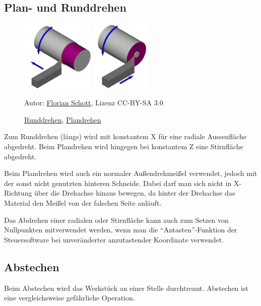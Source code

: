\documentclass{\basedir/fablab-document}
\begin{document}
\subsection{Plan- und Runddrehen}
\label{handdrehen:Plandrehen}
\begin{figure}
\centering
\includegraphics[height=3.4cm]{./img/laengs-rund-drehen.jpg}
\includegraphics[height=3.4cm]{./img/quer-plan-drehen.jpg}
\caption{\href{https://commons.wikimedia.org/w/index.php?title=File:L\%C3\%A4ngs-Rund-Drehen.jpg&oldid=101538812}{Runddrehen}, \href{https://commons.wikimedia.org/w/index.php?title=File:Quer-Plan-Drehen.jpg&oldid=154429461}{Plandrehen}}
Autor: \href{https://commons.wikimedia.org/wiki/User:Florian_Schott}{Florian Schott}, Lizenz CC-BY-SA 3.0
\end{figure}

Zum Runddrehen (längs) wird mit konstantem X für eine radiale Aussenfläche abgedreht.
Beim Plandrehen wird hingegen bei konstantem Z eine Stirnfläche abgedreht. 

Beim Plandrehen wird auch ein normaler Außendrehmeißel verwendet, jedoch mit der sonst nicht genutzten hinteren Schneide. Dabei darf man sich nicht in X-Richtung über die Drehachse hinaus bewegen, da hinter der Drehachse das Material den Meißel von der falschen Seite anläuft.

Das Abdrehen einer radialen oder Stirnfläche kann auch zum Setzen von Nullpunkten mitverwendet werden, wenn man die \enquote{Antasten}-Funktion der Steuersoftware bei unveränderter anzutastender Koordinate verwendet.

\subsection{Abstechen}
Beim Abstechen wird das Werkstück an einer Stelle durchtrennt. Abstechen ist eine vergleichsweise gefährliche Operation.
\end{document}
